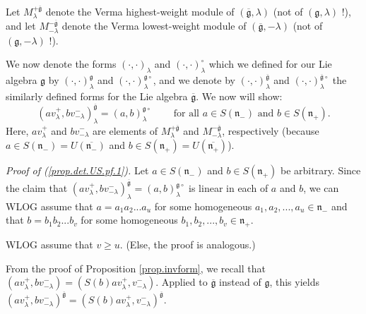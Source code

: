 \documentclass
[numbers=enddot,12pt,final,onecolumn,german,notitlepage]{scrartcl}%
\theoremstyle{definition}
\begin{document}
Let $M_{\lambda}^{+\overline{\mathfrak{g}}}$ denote the Verma highest-weight
module of $\left(  \overline{\mathfrak{g}},\lambda\right)  $ (not of $\left(
\mathfrak{g},\lambda\right)  $ !), and let $M_{-\lambda}^{-\overline
{\mathfrak{g}}}$ denote the Verma lowest-weight module of $\left(
\overline{\mathfrak{g}},-\lambda\right)  $ (not of $\left(  \mathfrak{g}%
,-\lambda\right)  $ !).

We now denote the forms $\left(  \cdot,\cdot\right)  _{\lambda}$ and $\left(
\cdot,\cdot\right)  _{\lambda}^{\circ}$ which we defined for our Lie algebra
$\mathfrak{g}$ by $\left(  \cdot,\cdot\right)  _{\lambda}^{\mathfrak{g}}$ and
$\left(  \cdot,\cdot\right)  _{\lambda}^{\mathfrak{g}\circ}$, and we denote by
$\left(  \cdot,\cdot\right)  _{\lambda}^{\overline{\mathfrak{g}}}$ and
$\left(  \cdot,\cdot\right)  _{\lambda}^{\overline{\mathfrak{g}}\circ}$ the
similarly defined forms for the Lie algebra $\overline{\mathfrak{g}}$. We now
will show:%
\begin{equation}
\left(  av_{\lambda}^{+},bv_{-\lambda}^{-}\right)  _{\lambda}^{\overline
{\mathfrak{g}}}=\left(  a,b\right)  _{\lambda}^{\mathfrak{g}\circ
}\ \ \ \ \ \ \ \ \ \ \text{for all }a\in S\left(  \mathfrak{n}_{-}\right)
\text{ and }b\in S\left(  \mathfrak{n}_{+}\right)  . \label{prop.det.US.pf.1}%
\end{equation}
Here, $av_{\lambda}^{+}$ and $bv_{-\lambda}^{-}$ are elements of $M_{\lambda
}^{+\overline{\mathfrak{g}}}$ and $M_{-\lambda}^{-\overline{\mathfrak{g}}}$,
respectively (because $a\in S\left(  \mathfrak{n}_{-}\right)  =U\left(
\overline{\mathfrak{n}_{-}}\right)  $ and $b\in S\left(  \mathfrak{n}%
_{+}\right)  =U\left(  \overline{\mathfrak{n}_{+}}\right)  $).

\textit{Proof of (\ref{prop.det.US.pf.1}).} Let $a\in S\left(  \mathfrak{n}%
_{-}\right)  $ and $b\in S\left(  \mathfrak{n}_{+}\right)  $ be arbitrary.
Since the claim that $\left(  av_{\lambda}^{+},bv_{-\lambda}^{-}\right)
_{\lambda}^{\overline{\mathfrak{g}}}=\left(  a,b\right)  _{\lambda
}^{\mathfrak{g}\circ}$ is linear in each of $a$ and $b$, we can WLOG assume
that $a=a_{1}a_{2}...a_{u}$ for some homogeneous $a_{1},a_{2},...,a_{u}%
\in\mathfrak{n}_{-}$ and that $b=b_{1}b_{2}...b_{v}$ for some homogeneous
$b_{1},b_{2},...,b_{v}\in\mathfrak{n}_{+}$.

WLOG assume that $v\geq u$. (Else, the proof is analogous.)

From the proof of Proposition \ref{prop.invform}, we recall that $\left(
av_{\lambda}^{+},bv_{-\lambda}^{-}\right)  =\left(  S\left(  b\right)
av_{\lambda}^{+},v_{-\lambda}^{-}\right)  $. Applied to $\overline
{\mathfrak{g}}$ instead of $\mathfrak{g}$, this yields $\left(  av_{\lambda
}^{+},bv_{-\lambda}^{-}\right)  ^{\overline{\mathfrak{g}}}=\left(  S\left(
b\right)  av_{\lambda}^{+},v_{-\lambda}^{-}\right)  ^{\overline{\mathfrak{g}}%
}$.
\end{document}
